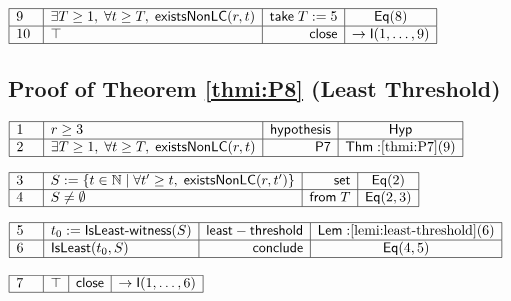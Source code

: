 \documentclass[11pt,reqno]{amsart}
\providecommand{\N}{\mathbb{N}}
\begin{document}
\nointerlineskip\noindent$%
\begin{array}{|m{0.5cm}|l|r|c|}
\hline
9 & \exists T\ge1,\;\forall t\ge T,\;\mathsf{existsNonLC}(r,t) & \mathsf{take%
}\;T:=5 & \mathsf{Eq}(8) \\ \hline
10 & \top & \mathsf{close} & \to\mathsf{I}(1,\dots,9) \\ \hline
\end{array}%
$

\medskip


\subsection*{Proof of Theorem \protect\ref{thmi:P8} (Least Threshold)}

\noindent$%
\begin{array}{|m{0.5cm}|l|r|c|}
\hline
1 & r\ge3 & \mathsf{hypothesis} & \mathsf{Hyp} \\ \hline
2 & \exists T\ge1,\;\forall t\ge T,\;\mathsf{existsNonLC}(r,t) & \mathsf{P7}
& \mathsf{Thm:}\ref{thmi:P7}(9) \\ \hline
\end{array}%
$

\nointerlineskip\noindent$%
\begin{array}{|m{0.5cm}|l|r|c|}
\hline
3 & S:=\{t\in\N\mid\forall t^{\prime}\ge t,\;\mathsf{existsNonLC}%
(r,t^{\prime})\} & \mathsf{set} & \mathsf{Eq}(2) \\ \hline
4 & S\ne\emptyset & \mathsf{from}\;T & \mathsf{Eq}(2,3) \\ \hline
\end{array}%
$

\nointerlineskip\noindent$%
\begin{array}{|m{0.5cm}|l|r|c|}
\hline
5 & t_{0}:=\mathsf{IsLeast\text{-}witness}(S) & \mathsf{least-threshold} & 
\mathsf{Lem:}\ref{lemi:least-threshold}(6) \\ \hline
6 & \mathsf{IsLeast}(t_{0},S) & \mathsf{conclude} & \mathsf{Eq}(4,5) \\ 
\hline
\end{array}%
$

\nointerlineskip\noindent$%
\begin{array}{|m{0.5cm}|l|r|c|}
\hline
7 & \top & \mathsf{close} & \to\mathsf{I}(1,\dots,6) \\ \hline
\end{array}%
$
\end{document}
